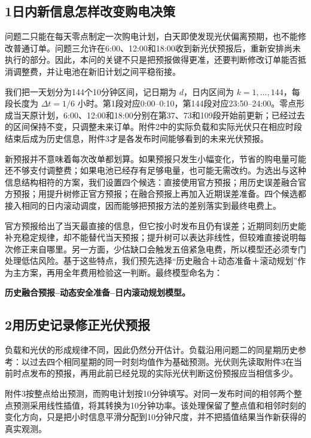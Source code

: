 \subsection*{1\quad 日内新信息怎样改变购电决策}

问题二只能在每天零点制定一次购电计划，白天即使发现光伏偏离预期，也不能修改普通订单。问题三允许在6:00、12:00和18:00收到新光伏预报后，重新安排尚未执行的部分。因此，本问的关键不只是把预报做得更准，还要判断修改订单能否抵消调整费，并让电池在新旧计划之间平稳衔接。

我们把一天划分为144个10分钟区间，记日期为 $d$，日内区间为 $k=1,\ldots,144$，每段长度为 $\Delta t=1/6$ 小时。第1段对应0:00--0:10，第144段对应23:50--24:00。零点形成当天原计划，6:00、12:00和18:00分别在第37、73和109段开始前更新；已经过去的区间保持不变，只调整未来订单。附件2中的实际负载和实际光伏只在相应时段结束后成为历史信息，附件3才是各发布时间能够看到的未来光伏预报。

新预报并不意味着每次改单都划算。如果预报只发生小幅变化，节省的购电量可能还不够支付调整费；如果电池已经存有足够电量，也可能无需改约。为选出与这种信息结构相符的方案，我们设置四个候选：直接使用官方预报；用历史误差融合官方预报；用提升树修正官方预报；在融合预报上再加入近期误差准备。四个候选都接入相同的日内滚动调度，因而能够把预报方法的差别落实到最终电费上。

官方预报给出了当天最直接的信息，但它按小时发布且仍有误差；近期同刻历史能补充稳定规律，却不能替代当天预报；提升树可以表达非线性，但较难直接说明每次修正来自哪里。另一方面，少估缺口会触发五倍紧急电费，所以模型还必须专门处理低估风险。基于这些特点，我们预先选择“历史融合＋动态准备＋滚动规划”作为主方案，再用全年费用检验这一判断。最终模型命名为：

\textbf{历史融合预报--动态安全准备--日内滚动规划模型。}

\subsection*{2\quad 用历史记录修正光伏预报}

负载和光伏的形成规律不同，因此仍然分开估计。负载沿用问题二的同星期历史参考：以过去四个相同星期的同一时刻均值作为基础预测。光伏则先读取附件3在当前时点发布的预报，再用此前已经兑现的实际光伏判断这份预报应当相信多少。

附件3按整点给出预测，而购电计划按10分钟填写。对同一发布时间的相邻两个整点预测采用线性插值，将其转换为10分钟功率。该处理保留了整点值和相邻时刻的变化方向，只是把小时信息平滑分配到10分钟尺度，并不把插值结果当作新获得的真实观测。

